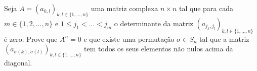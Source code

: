 Seja \(A=(a_{k, l})_{k, l \in \{1, \dots, n\}}\) uma matriz complexa \(n \times n\) tal que para cada \(m \in \{1,2,\dots,n\}\) e \(1 \leq  j_{1} <\dots<j_{m}\) o determinante da matriz \((a_{j_{k}, j_{l}})_{k, l \in \{1, \dots, n\}}\) é zero. Prove que \(A^{n}=0\) e que existe uma permutação \(\sigma \in S_{n}\) tal que a matriz \((a_{\sigma(k), \sigma(l)})_{k, l \in \{1, \dots, n\}}\) tem todos os seus elementos não nulos acima da diagonal.
